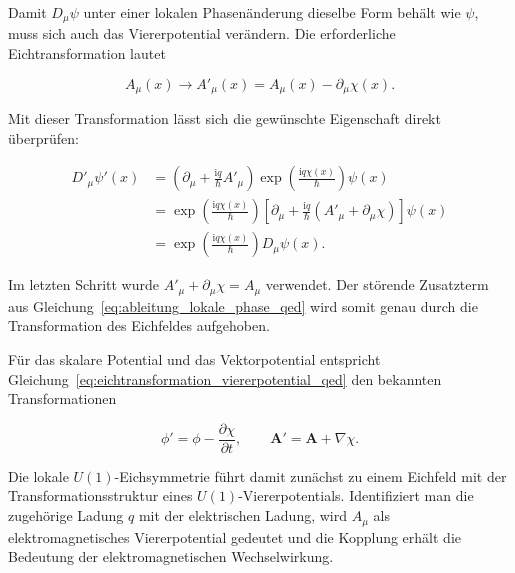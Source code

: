 Damit \(D_\mu\psi\) unter einer lokalen Phasenänderung dieselbe Form
behält wie \(\psi\), muss sich auch das Viererpotential verändern. Die
erforderliche Eichtransformation
lautet

\begin{equation}
	A_\mu(x)
	\longrightarrow
	A'_\mu(x)
	=
	A_\mu(x)
	-
	\partial_\mu\chi(x).
	\label{eq:eichtransformation_viererpotential_qed}
\end{equation}

Mit dieser Transformation lässt sich die gewünschte Eigenschaft direkt
überprüfen:

\begin{equation}
	\begin{aligned}
		D'_\mu\psi'(x)
		&=
		\left(
		\partial_\mu
		+
		\frac{\mathrm{i}q}{\hbar}A'_\mu
		\right)
		\exp\left(
		\frac{\mathrm{i}q\chi(x)}{\hbar}
		\right)
		\psi(x)
		\\[4pt]
		&=
		\exp\left(
		\frac{\mathrm{i}q\chi(x)}{\hbar}
		\right)
		\left[
		\partial_\mu
		+
		\frac{\mathrm{i}q}{\hbar}
		\left(
		A'_\mu
		+
		\partial_\mu\chi
		\right)
		\right]
		\psi(x)
		\\[4pt]
		&=
		\exp\left(
		\frac{\mathrm{i}q\chi(x)}{\hbar}
		\right)
		D_\mu\psi(x).
	\end{aligned}
	\label{eq:transformation_kovariante_ableitung_qed}
\end{equation}

Im letzten Schritt wurde
\(A'_\mu+\partial_\mu\chi=A_\mu\) verwendet. Der störende Zusatzterm
aus Gleichung~\eqref{eq:ableitung_lokale_phase_qed} wird somit genau
durch die Transformation des Eichfeldes aufgehoben.

Für das skalare Potential und das Vektorpotential entspricht
Gleichung~\eqref{eq:eichtransformation_viererpotential_qed} den bekannten
Transformationen

\begin{equation}
	\phi'
	=
	\phi
	-
	\frac{\partial\chi}{\partial t},
	\qquad
	\mathbf A'
	=
	\mathbf A
	+
	\nabla\chi.
	\label{eq:eichtransformation_potentiale_qed}
\end{equation}

Die lokale \(U(1)\)-Eichsymmetrie führt damit zunächst zu einem Eichfeld
mit der Transformationsstruktur eines \(U(1)\)-Viererpotentials.
Identifiziert man die zugehörige Ladung \(q\) mit der elektrischen
Ladung, wird \(A_\mu\) als elektromagnetisches Viererpotential gedeutet
und die Kopplung erhält die Bedeutung der elektromagnetischen
Wechselwirkung.

